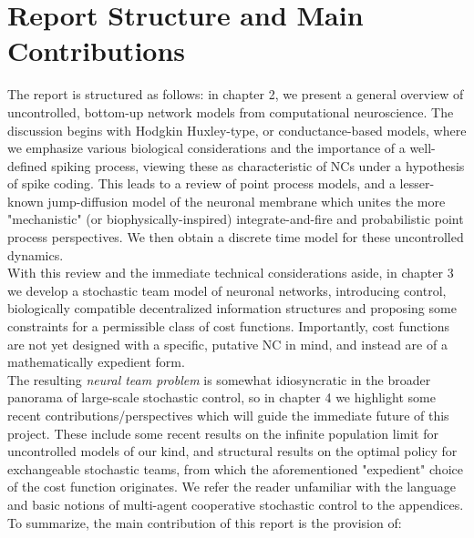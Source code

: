 \documentclass[12pt, oneside]{report}
\newcommand{\1}[1]{\mathbbm{1}_{\{#1\}}}
\theoremstyle{definition}
\begin{document}
\section{Report Structure and Main Contributions}
The report is structured as follows: in chapter 2, we present a general overview of uncontrolled, bottom-up network
models from computational neuroscience. The discussion begins with Hodgkin Huxley-type, or conductance-based models, where we emphasize
various biological considerations and the importance of a well-defined spiking process, viewing these as characteristic of NCs under a
hypothesis of spike coding. This leads to a review of point process models, and a lesser-known jump-diffusion model of the neuronal membrane
which unites the more "mechanistic" (or biophysically-inspired) integrate-and-fire and probabilistic point process perspectives. We then obtain a discrete time model
for these uncontrolled dynamics.\\[5pt]
\indent With this review and the immediate technical considerations aside, in chapter 3 we develop a stochastic team model of neuronal networks,
introducing control, biologically compatible decentralized information structures and proposing some constraints for a permissible class of cost functions. Importantly, cost functions are not yet designed
with a specific, putative NC in mind, and instead are of a mathematically expedient form.\\[5pt]
\indent The resulting \textit{neural team problem} is somewhat idiosyncratic in the broader panorama of large-scale
stochastic control, so in chapter 4 we highlight some recent contributions/perspectives which will guide the immediate future of this project. These include some recent results
on the infinite population limit for uncontrolled models of our kind, and structural results on the optimal policy for exchangeable stochastic teams, from which the aforementioned "expedient" choice
of the cost function originates. We refer the reader unfamiliar with the language and basic notions of multi-agent cooperative stochastic control to the appendices.\\[5pt]
\indent To summarize, the main contribution of this report is the provision of:
\end{document}
